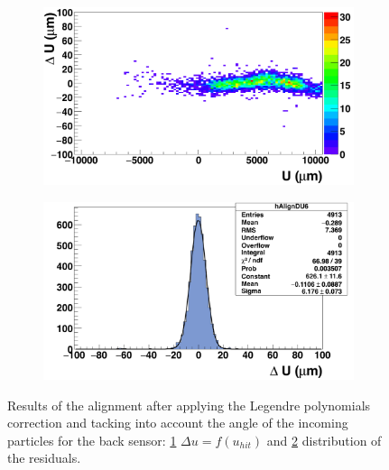 \begin{figure}[!h]
        \begin{subfigure}[t]{0.45\textwidth}
          \centering
          \includegraphics[width = 1.2\textwidth]{Pictures/deformation/deltaUU_6_corrected1.png}
          \caption{}
          \label{fig:scatterDUU_corrected_back}
        \end{subfigure}
        \hfill
        \begin{subfigure}[t]{0.45\textwidth}
          \centering
          \includegraphics[width = 1.2\textwidth]{Pictures/deformation/deltaU_6_corrected1.png}
          \caption{}
          \label{fig:residualU_corrected_back}
        \end{subfigure}
        \caption{Results of the alignment after applying the Legendre polynomials correction and tacking into account the angle of the incoming particles for the back sensor: \ref{fig:scatterDUU_corrected_back} $\Delta u=f(u_{hit})$ and \ref{fig:residualU_corrected_back} distribution of the residuals.}
        \label{fig:alignmnetCorrected_back}

      \end{figure}

